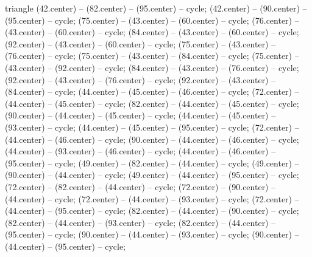 \begin{pgfonlayer}{triangle}
 (42.center) -- (82.center) -- (95.center) -- cycle; 
 (42.center) -- (90.center) -- (95.center) -- cycle; 
 (75.center) -- (43.center) -- (60.center) -- cycle; 
 (76.center) -- (43.center) -- (60.center) -- cycle; 
 (84.center) -- (43.center) -- (60.center) -- cycle; 
 (92.center) -- (43.center) -- (60.center) -- cycle; 
 (75.center) -- (43.center) -- (76.center) -- cycle; 
 (75.center) -- (43.center) -- (84.center) -- cycle; 
 (75.center) -- (43.center) -- (92.center) -- cycle; 
 (84.center) -- (43.center) -- (76.center) -- cycle; 
 (92.center) -- (43.center) -- (76.center) -- cycle; 
 (92.center) -- (43.center) -- (84.center) -- cycle; 
 (44.center) -- (45.center) -- (46.center) -- cycle; 
 (72.center) -- (44.center) -- (45.center) -- cycle; 
 (82.center) -- (44.center) -- (45.center) -- cycle; 
 (90.center) -- (44.center) -- (45.center) -- cycle; 
 (44.center) -- (45.center) -- (93.center) -- cycle; 
 (44.center) -- (45.center) -- (95.center) -- cycle; 
 (72.center) -- (44.center) -- (46.center) -- cycle; 
 (90.center) -- (44.center) -- (46.center) -- cycle; 
 (44.center) -- (93.center) -- (46.center) -- cycle; 
 (44.center) -- (46.center) -- (95.center) -- cycle; 
 (49.center) -- (82.center) -- (44.center) -- cycle; 
 (49.center) -- (90.center) -- (44.center) -- cycle; 
 (49.center) -- (44.center) -- (95.center) -- cycle; 
 (72.center) -- (82.center) -- (44.center) -- cycle; 
 (72.center) -- (90.center) -- (44.center) -- cycle; 
 (72.center) -- (44.center) -- (93.center) -- cycle; 
 (72.center) -- (44.center) -- (95.center) -- cycle; 
 (82.center) -- (44.center) -- (90.center) -- cycle; 
 (82.center) -- (44.center) -- (93.center) -- cycle; 
 (82.center) -- (44.center) -- (95.center) -- cycle; 
 (90.center) -- (44.center) -- (93.center) -- cycle; 
 (90.center) -- (44.center) -- (95.center) -- cycle; 

\end{pgfonlayer}
